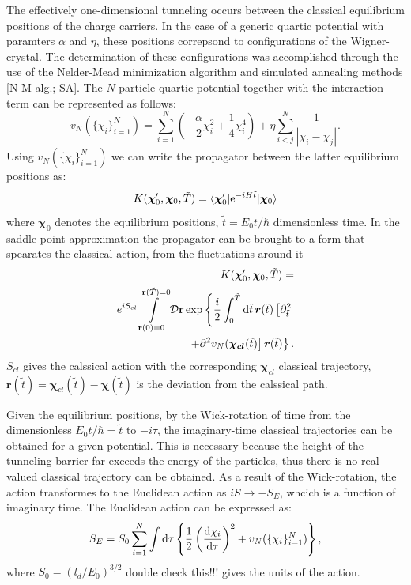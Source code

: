 \documentclass[prb,twocolumn,showpacs,preprintnumbers,amsmath,amssymb, superscriptaddress]{revtex4-2}
\newcommand{\n}{N}
\newcommand{\e}{\text e}
\newcommand{\1}{{1\hspace*{-0.5ex} \textrm{l} \hspace*{0.5ex}}}
\begin{document}
The effectively one-dimensional tunneling occurs between the classical equilibrium positions of the charge carriers. In the case of a generic quartic potential with paramters $\alpha$ and $\eta$, these positions correpsond to configurations of the Wigner-crystal. The determination of these configurations was accomplished through the use of the Nelder-Mead minimization algorithm and simulated annealing methods [N-M alg.; SA]. The $N$-particle quartic potential together with the interaction term can be represented as follows:
\begin{equation}
	v_\n(\{\chi_i\}_{i=1}^\n) = \sum_{i=1}^\n \left(-\frac{\alpha}{2} \chi_i^2 + \frac{1}{4} \chi_i^4   \right) + \eta \sum_{i < j}^\n \frac{1}{|\chi_i - \chi_j |}.
\end{equation} 
Using $v_\n(\{\chi_i\}_{i=1}^\n)$ we can write the propagator between the latter equilibrium positions as:
\begin{equation}
K(\mathbold{\chi}_0^\prime, \mathbold{\chi}_0, \tilde{T}) = \langle \mathbold{\chi}_0^\prime \vert \e^{-i\tilde{H}\tilde{t}} \vert \mathbold{\chi}_0 \rangle
\end{equation}
where $\mathbold{\chi}_0$ denotes the equilibrium positions, $\tilde{t} = E_0 t/\hbar$ dimensionless time. In the saddle-point approximation the propagator can be brought to a form that spearates the classical action, from the fluctuations around it
\begin{align}
	K(\mathbold{\chi}_0^\prime, \mathbold{\chi}_0, \tilde{T}) =\\
	 e^{iS_{cl}} \int\limits_{\mathbf{r}(0) = 0}^{\mathbf{r}(\tilde{T}) = 0} \mathcal{D}\textbf{r} \exp \left\lbrace  \frac{i}{2} \int_{0}^{\tilde{T}} {\rm{d}} \tilde{t}\, \mathbold{r}(\tilde{t}) \left[ \partial^2_{\tilde{t}} \right. \right.\\
	\left. \left. + \partial^2 v_\n(\mathbold{\chi_{cl}}(\tilde{t}) \right] \mathbold{r}(\tilde{t})\right\rbrace.
\end{align} 
$S_{cl}$ gives the calssical action with the corresponding $\mathbold{\chi}_{cl}$ classical trajectory, $\mathbold{r}(\tilde{t}) = \mathbold{\chi}_{cl}(\tilde{t}) - \mathbold{\chi}(\tilde{t}) $ is the deviation from the calssical path.

Given the equilibrium positions, by the Wick-rotation of time from the dimensionless $E_0 t /\hbar = \tilde{t}$ to $-i\tau$, the imaginary-time classical trajectories can be obtained for a given potential. This is necessary because the height of the tunneling barrier far exceeds the energy of the particles, thus there is no real valued classical trajectory can be obtained. As a result of the Wick-rotation, the action transformes to the Euclidean action as $iS \rightarrow -S_E$, whcich is a function of imaginary time. The Euclidean action can be expressed as:
\begin{equation}\label{ImagAction}
	S_E = S_0 \sum_{i = 1}^\n \int {\rm{d}} \tau \left\lbrace \frac{1}{2}\left( \frac{{\rm{d}} \chi_i}{{\rm{d}} \tau} \right)^2 + v_\n(\{\chi_i\}_{i=1}^\n)   \right\rbrace,
\end{equation}
where $S_0 = (l_d / E_0)^{3/2}$ {\color{red} double check this!!!} gives the units of the action.
\end{document}
